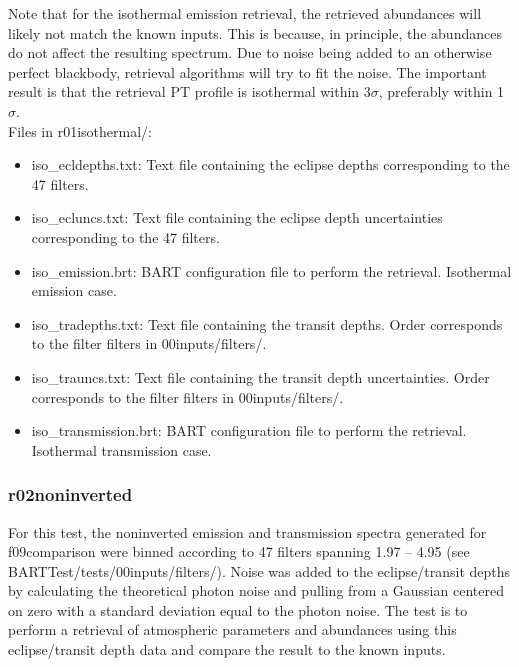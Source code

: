 \documentclass[letterpaper, 12pt]{article}
\begin{document}
Note that for the isothermal emission retrieval, the retrieved abundances will 
likely not match the known inputs. This is because, in principle, the 
abundances do not affect the resulting spectrum. Due to noise being added to 
an otherwise perfect blackbody, retrieval algorithms will try to 
fit the noise. The important result is that the retrieval PT profile is 
isothermal within 3$\sigma$, preferably within 1$\sigma$.\\

Files in r01isothermal/:
\begin{itemize} \itemsep0pt
  \item iso{\_}ecldepths.txt: Text file containing the eclipse depths 
        corresponding to the 47 filters.
  \item iso{\_}ecluncs.txt: Text file containing the eclipse depth 
        uncertainties corresponding to the 47 filters.
  \item iso{\_}emission.brt: BART configuration file to perform the retrieval. 
        Isothermal emission case.
  \item iso{\_}tradepths.txt: Text file containing the transit depths. Order 
        corresponds to the filter filters in 00inputs/filters/.
  \item iso{\_}trauncs.txt: Text file containing the transit depth 
        uncertainties. 
        Order corresponds to the filter filters in 00inputs/filters/.
  \item iso{\_}transmission.brt: BART configuration file to perform the 
        retrieval. Isothermal transmission case.
\end{itemize}

\subsubsection{r02noninverted}
For this test, the noninverted emission and transmission spectra generated for 
f09comparison were binned according to 47 filters spanning 
1.97 -- 4.95 \microns (see BARTTest/tests/00inputs/filters/). 
Noise was added to the eclipse/transit 
depths by calculating the theoretical photon noise and pulling from a Gaussian 
centered on zero with a standard deviation equal to the photon noise. The test 
is to perform a retrieval of atmospheric parameters and abundances using this 
eclipse/transit depth data and compare the result to the known inputs.\\
\end{document}
